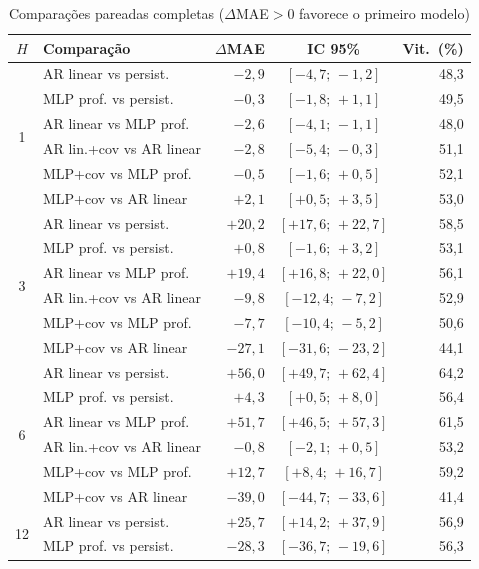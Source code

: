 \documentclass[12pt,a4paper,oneside]{article}
\begin{document}
\begin{table}[H]
\centering
\caption{Comparações pareadas completas ($\Delta$MAE${}>0$ favorece o primeiro modelo)}
\label{tab:apB}
\small
\begin{tabular}{@{}clrcr@{}}
\toprule
\textbf{$H$} & \textbf{Comparação} & \textbf{$\Delta$MAE} & \textbf{IC 95\%} & \textbf{Vit.\ (\%)} \\
\midrule
\multirow{6}{*}{1}
 & AR linear vs persist. & $-2{,}9$ & $[-4{,}7;\,-1{,}2]$ & 48,3 \\
 & MLP prof. vs persist. & $-0{,}3$ & $[-1{,}8;\,+1{,}1]$ & 49,5 \\
 & AR linear vs MLP prof. & $-2{,}6$ & $[-4{,}1;\,-1{,}1]$ & 48,0 \\
 & AR lin.+cov vs AR linear & $-2{,}8$ & $[-5{,}4;\,-0{,}3]$ & 51,1 \\
 & MLP+cov vs MLP prof. & $-0{,}5$ & $[-1{,}6;\,+0{,}5]$ & 52,1 \\
 & MLP+cov vs AR linear & $+2{,}1$ & $[+0{,}5;\,+3{,}5]$ & 53,0 \\
\midrule
\multirow{6}{*}{3}
 & AR linear vs persist. & $+20{,}2$ & $[+17{,}6;\,+22{,}7]$ & 58,5 \\
 & MLP prof. vs persist. & $+0{,}8$ & $[-1{,}6;\,+3{,}2]$ & 53,1 \\
 & AR linear vs MLP prof. & $+19{,}4$ & $[+16{,}8;\,+22{,}0]$ & 56,1 \\
 & AR lin.+cov vs AR linear & $-9{,}8$ & $[-12{,}4;\,-7{,}2]$ & 52,9 \\
 & MLP+cov vs MLP prof. & $-7{,}7$ & $[-10{,}4;\,-5{,}2]$ & 50,6 \\
 & MLP+cov vs AR linear & $-27{,}1$ & $[-31{,}6;\,-23{,}2]$ & 44,1 \\
\midrule
\multirow{6}{*}{6}
 & AR linear vs persist. & $+56{,}0$ & $[+49{,}7;\,+62{,}4]$ & 64,2 \\
 & MLP prof. vs persist. & $+4{,}3$ & $[+0{,}5;\,+8{,}0]$ & 56,4 \\
 & AR linear vs MLP prof. & $+51{,}7$ & $[+46{,}5;\,+57{,}3]$ & 61,5 \\
 & AR lin.+cov vs AR linear & $-0{,}8$ & $[-2{,}1;\,+0{,}5]$ & 53,2 \\
 & MLP+cov vs MLP prof. & $+12{,}7$ & $[+8{,}4;\,+16{,}7]$ & 59,2 \\
 & MLP+cov vs AR linear & $-39{,}0$ & $[-44{,}7;\,-33{,}6]$ & 41,4 \\
\midrule
\multirow{6}{*}{12}
 & AR linear vs persist. & $+25{,}7$ & $[+14{,}2;\,+37{,}9]$ & 56,9 \\
 & MLP prof. vs persist. & $-28{,}3$ & $[-36{,}7;\,-19{,}6]$ & 56,3 \\

\end{tabular}
\end{table}
\end{document}
